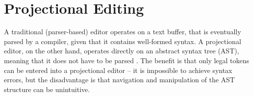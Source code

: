 

\section{Projectional Editing}
A traditional (parser-based) editor operates on a text buffer, that is eventually parsed by a compiler, given that it contains well-formed syntax. A projectional editor, on the other hand, operates directly on an abstract syntax tree (AST), meaning that it does not have to be parsed \cite{voelter2014towards}. The benefit is that only legal tokens can be entered into a projectional editor -- it is impossible to achieve syntax errors, but the disadvantage is that navigation and manipulation of the AST structure can be unintuitive. 

